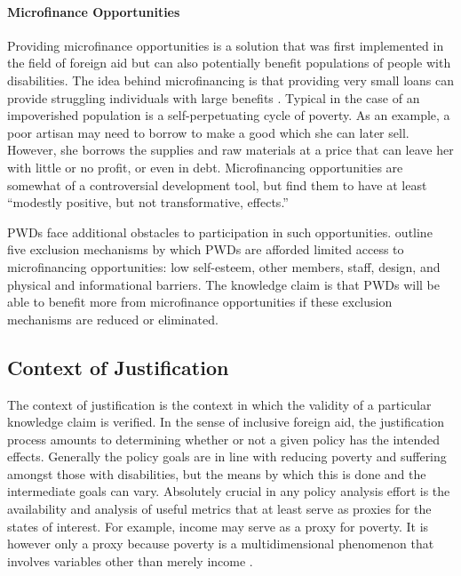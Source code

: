 \documentclass[a4paper]{article}
\begin{document}
\paragraph{Microfinance Opportunities}

Providing microfinance opportunities is a solution that was first implemented
in the field of foreign aid but can also potentially benefit populations of
people with disabilities. The idea behind microfinancing is that providing
very small loans can provide struggling individuals with large benefits
\citep{wendt2006building}. Typical in the case of an impoverished population
is a self-perpetuating cycle of poverty. As an example, a poor artisan may
need to borrow to make a good which she can later sell. However, she borrows
the supplies and raw materials at a price that can leave her with little or no
profit, or even in debt. Microfinancing opportunities are somewhat of a
controversial development tool, but \cite{banerjee2015six} find them to have
at least ``modestly positive, but not transformative, effects.''

PWDs face additional obstacles to participation in such opportunities.
\cite{mersland2008access} outline five exclusion mechanisms by which PWDs are
afforded limited access to microfinancing opportunities: low self-esteem,
other members, staff, design, and physical and informational barriers. The
knowledge claim is that PWDs will be able to benefit more from microfinance
opportunities if these exclusion mechanisms are reduced or eliminated.

\subsection{Context of Justification}

The context of justification is the context in which the validity of a
particular knowledge claim is verified. In the sense of inclusive foreign aid,
the justification process amounts to determining whether or not a given policy
has the intended effects. Generally the policy goals are in line with reducing
poverty and suffering amongst those with disabilities, but the means by which
this is done and the intermediate goals can vary. Absolutely crucial in any
policy analysis effort is the availability and analysis of useful metrics that
at least serve as proxies for the states of interest. For example, income may
serve as a proxy for poverty. It is however only a proxy because poverty is a
multidimensional phenomenon that involves variables other than merely income
\citep{alkire2011understandings}.
\end{document}

